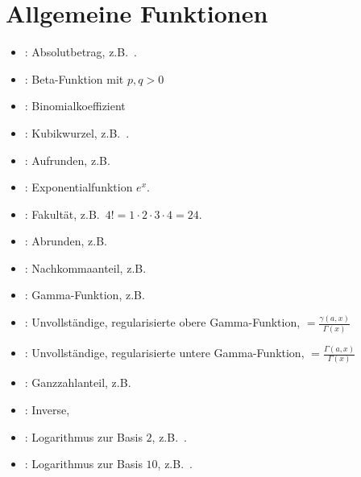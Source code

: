 \chapter{Allgemeine Funktionen}

\begin{itemize}

\item
{}:
Absolutbetrag, z.B.\ .

\item
{}:
Beta-Funktion mit $p,q>0$

\item
{}:
Binomialkoeffizient

\item
{}:
Kubikwurzel, z.B.\ .

\item
{}:
Aufrunden, z.B.\ 

\item
{}:
Exponentialfunktion $e^x$.

\item
{}:
Fakultät, z.B.\ $4!=1\cdot2\cdot3\cdot4=24$.

\item
{}:
Abrunden, z.B.\ 

\item
{}:
Nachkommaanteil, z.B.\ 

\item
{}:
Gamma-Funktion, z.B.\ 

\item
{}:
Unvollständige, regularisierte obere Gamma-Funktion, $=\frac{\gamma(a,x)}{\Gamma(x)}$
\item

:
Unvollständige, regularisierte untere Gamma-Funktion, $=\frac{\Gamma(a,x)}{\Gamma(x)}$

\item
{}:
Ganzzahlanteil, z.B.\ 

\item
{}:
Inverse, 

\item
{}:
Logarithmus zur Basis $2$, z.B.\ .

\item
{}:
Logarithmus zur Basis $10$, z.B.\ .


\end{itemize}
